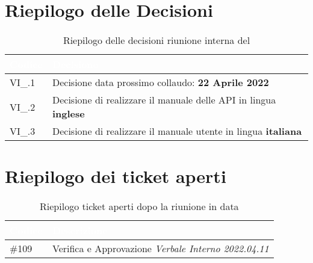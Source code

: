 \section{Riepilogo delle Decisioni}


\begin{table}[!htbp]
    \renewcommand{\arraystretch}{1.5}
    \begin{tabular}{m{}<{\centering}  m{}<{\centering}}
        \rowcolor{darkblue} \textcolor{white}{\textbf{Codice}} & \textcolor{white}{\textbf{Decisione}}                        \\
        \hline
        VI\_{}\D{}.1                                           & Decisione data prossimo collaudo: \textbf{22 Aprile 2022} \\
        VI\_{}\D{}.2                                           & Decisione di realizzare il manuale delle API in lingua \textbf{inglese} \\
		VI\_{}\D{}.3                                           & Decisione di realizzare il manuale utente in lingua \textbf{italiana} \\
    \end{tabular}
    \caption{Riepilogo delle decisioni riunione interna del \D}
\end{table}

\section{Riepilogo dei ticket aperti}

\begin{table}[!htbp]
    \renewcommand{\arraystretch}{1.5}
    \begin{tabular}{m{}<{\centering}  m{}<{\centering}}
        \rowcolor{darkblue} \textcolor{white}{\textbf{Codice}} & \textcolor{white}{\textbf{Descrizione}}                        \\
        \hline
        \#{109}										  & Verifica e Approvazione \textit{Verbale Interno 2022.04.11} \\
    \end{tabular}
    \caption{Riepilogo ticket aperti dopo la riunione in data \D}
\end{table}